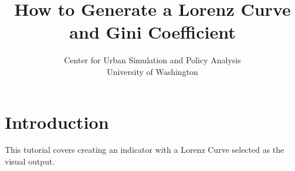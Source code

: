 \documentclass{howto}
\begin{document}


\title{How to Generate a Lorenz Curve\\and Gini Coefficient}


\author{Center for Urban Simulation and Policy Analysis\\
University of Washington}



\maketitle



\section*{Introduction}

This tutorial covers creating an indicator with a Lorenz Curve selected as the
visual output.
 
\end{document}
